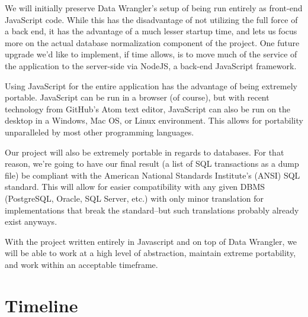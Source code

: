 \documentclass{../sty/acm_proc_article-sp}
\begin{document}
We will initially preserve Data Wrangler's setup of being run entirely as front-end JavaScript code. While this has the disadvantage of not utilizing the full force of a back end, it has the advantage of a much lesser startup time, and lets us focus more on the actual database normalization component of the project. One future upgrade we'd like to implement, if time allows, is to move much of the service of the application to the server-side via NodeJS, a back-end JavaScript framework.

Using JavaScript for the entire application has the advantage of being extremely portable. JavaScript can be run in a browser (of course), but with recent technology from GitHub's Atom text editor, JavaScript can also be run on the desktop in a Windows, Mac OS, or Linux environment. This allows for portability unparalleled by most other programming languages.

Our project will also be extremely portable in regards to databases. For that reason, we're going to have our final result (a list of SQL transactions as a dump file) be compliant with the American National Standards Institute's (ANSI) SQL standard. This will allow for easier compatibility with any given DBMS (PostgreSQL, Oracle, SQL Server, etc.) with only minor translation for implementations that break the standard--but such translations probably already exist anyways.

With the project written entirely in Javascript and on top of Data Wrangler, we will be able to work at a high level of abstraction, maintain extreme portability, and work within an acceptable timeframe.


\section{Timeline}
\end{document}

